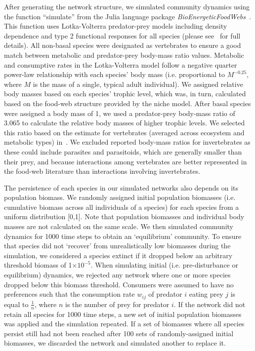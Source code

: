 \documentclass[12pt]{article}
\begin{document}
	After generating the network structure, we simulated community dynamics using the function ``simulate'' from the Julia language package \emph{BioEnergeticFoodWebs}~\citep{bioenergeticfw,Delmas2017}. This function uses Lotka-Volterra predator-prey models including density dependence and type 2 functional responses for all species (please see~\citet{Delmas2017} for full details).
	All non-basal species were designated as vertebrates to ensure a good match between metabolic and predator-prey body-mass ratio values. Metabolic and consumptive rates in the Lotka-Volterra model follow a negative quarter power-law relationship with each species' body mass (i.e. proportional to $M^{-0.25}$, where $M$ is the mass of a single, typical adult individual). We assigned relative body masses based on each species' trophic level, which was, in turn, calculated based on the food-web structure provided by the niche model. After basal species were assigned a body mass of 1, we used a predator-prey body-mass ratio of 3.065 to calculate the relative body masses of higher trophic levels. We selected this ratio based on the estimate for vertebrates (averaged across ecosystem and metabolic types) in~\citet{Brose2006}. We excluded reported body-mass ratios for invertebrates as these could include parasites and parasitoids, which are generally smaller than their prey, and because interactions among vertebrates are better represented in the food-web literature than interactions involving invertebrates.
	
	
	The persistence of each species in our simulated networks also depends on its population biomass. 
	We randomly assigned initial population biomasses (i.e. cumulative biomass across all individuals of a species) for each species from a uniform distribution [0,1]. Note that population biomasses and individual body masses are not calculated on the same scale. We then simulated community dynamics for 1000 time steps to obtain an `equilibrium' community. To ensure that species did not `recover' from unrealistically low biomasses during the simulation, we considered a species extinct if it dropped below an arbitrary threshold biomass of 1$\times10^{-5}$. When simulating initial (i.e. pre-disturbance or equilibrium) dynamics, we rejected any network where one or more species dropped below this biomass threshold. Consumers were assumed to have no preferences such that the consumption rate $w_{ij}$ of predator $i$ eating prey $j$ is equal to $\frac{1}{n}$, where $n$ is the number of prey for predator $i$. If the network did not retain all species for 1000 time steps, a new set of initial population biomasses was applied and the simulation repeated.
	If a set of biomasses where all species persist still had not been reached after 100 sets of randomly-assigned initial biomasses, we discarded the network and simulated another to replace it.
\end{document}

